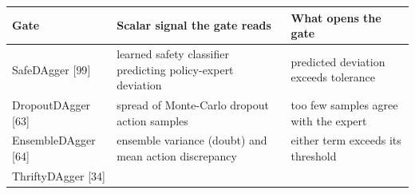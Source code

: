 \documentclass[
  11pt,
]{article}
\begin{document}
\begin{longtable}[]{@{}lll@{}}
\toprule
\begin{minipage}[b]{0.30\columnwidth}\raggedright
Gate\strut
\end{minipage} & \begin{minipage}[b]{0.30\columnwidth}\raggedright
Scalar signal the gate reads\strut
\end{minipage} & \begin{minipage}[b]{0.30\columnwidth}\raggedright
What opens the gate\strut
\end{minipage}\tabularnewline
\midrule
\endhead
\begin{minipage}[t]{0.30\columnwidth}\raggedright
SafeDAgger {[}99{]}\strut
\end{minipage} & \begin{minipage}[t]{0.30\columnwidth}\raggedright
learned safety classifier predicting policy-expert deviation\strut
\end{minipage} & \begin{minipage}[t]{0.30\columnwidth}\raggedright
predicted deviation exceeds tolerance\strut
\end{minipage}\tabularnewline
\begin{minipage}[t]{0.30\columnwidth}\raggedright
DropoutDAgger {[}63{]}\strut
\end{minipage} & \begin{minipage}[t]{0.30\columnwidth}\raggedright
spread of Monte-Carlo dropout action samples\strut
\end{minipage} & \begin{minipage}[t]{0.30\columnwidth}\raggedright
too few samples agree with the expert\strut
\end{minipage}\tabularnewline
\begin{minipage}[t]{0.30\columnwidth}\raggedright
EnsembleDAgger {[}64{]}\strut
\end{minipage} & \begin{minipage}[t]{0.30\columnwidth}\raggedright
ensemble variance (doubt) and mean action discrepancy\strut
\end{minipage} & \begin{minipage}[t]{0.30\columnwidth}\raggedright
either term exceeds its threshold\strut
\end{minipage}\tabularnewline
\begin{minipage}[t]{0.30\columnwidth}\raggedright
ThriftyDAgger {[}34{]}\strut
\end{minipage} & \begin{minipage}[t]{0.30\columnwidth}\raggedright

\end{minipage}
\end{longtable}
\end{document}
